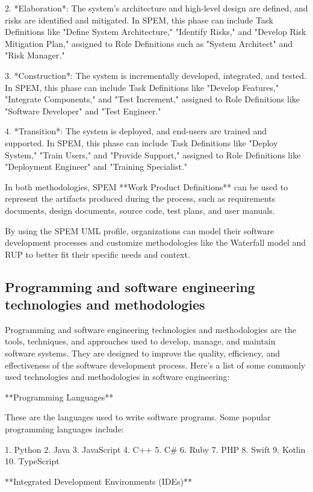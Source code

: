 \documentclass{article}
\begin{document}
2. *Elaboration*: The system's architecture and high-level design are defined, and risks are identified and mitigated. In SPEM, this phase can include Task Definitions like "Define System Architecture," "Identify Risks," and "Develop Risk Mitigation Plan," assigned to Role Definitions such as "System Architect" and "Risk Manager."

3. *Construction*: The system is incrementally developed, integrated, and tested. In SPEM, this phase can include Task Definitions like "Develop Features," "Integrate Components," and "Test Increment," assigned to Role Definitions like "Software Developer" and "Test Engineer."

4. *Transition*: The system is deployed, and end-users are trained and supported. In SPEM, this phase can include Task Definitions like "Deploy System," "Train Users," and "Provide Support," assigned to Role Definitions like "Deployment Engineer" and "Training Specialist."

In both methodologies, SPEM **Work Product Definitions** can be used to represent the artifacts produced during the process, such as requirements documents, design documents, source code, test plans, and user manuals. 

By using the SPEM UML profile, organizations can model their software development processes and customize methodologies like the Waterfall model and RUP to better fit their specific needs and context.


\subsection{Programming and software engineering technologies and methodologies}

Programming and software engineering technologies and methodologies are the tools, techniques, and approaches used to develop, manage, and maintain software systems. They are designed to improve the quality, efficiency, and effectiveness of the software development process. Here's a list of some commonly used technologies and methodologies in software engineering:

**Programming Languages**

These are the languages used to write software programs. Some popular programming languages include:

1. Python
2. Java
3. JavaScript
4. C++
5. C#
6. Ruby
7. PHP
8. Swift
9. Kotlin
10. TypeScript

**Integrated Development Environments (IDEs)**
\end{document}
